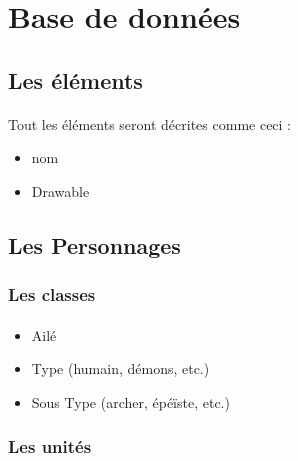 \newpage
\section{Base de données}

\subsection{Les éléments}
\paragraph{} Tout les éléments seront décrites comme ceci :
\begin{itemize}
	\item nom
	\item Drawable
\end{itemize}

\subsection{Les Personnages}

\subsubsection{Les classes}

\paragraph{}
\begin{itemize}
	\item Ailé
	\item Type (humain, démons, etc.)
	\item Sous Type (archer, épéïste, etc.)
\end{itemize}

\subsubsection{Les unités}
